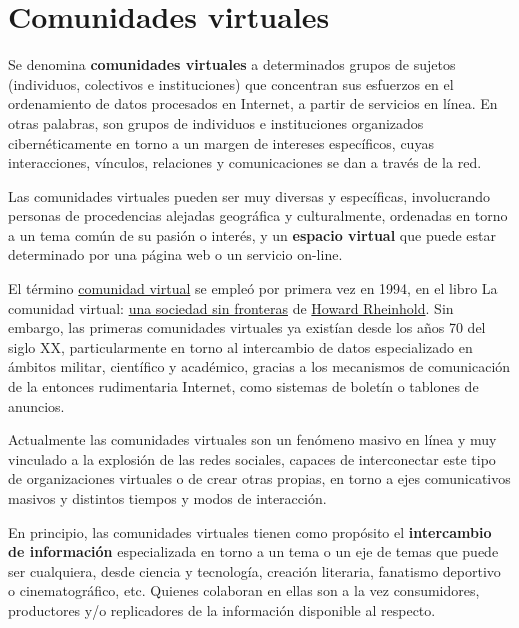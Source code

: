 \chapter{Comunidades virtuales}
\label{comunidades-virtuales}

Se denomina \textbf{comunidades virtuales} a determinados grupos de sujetos (individuos, colectivos e instituciones) que concentran sus esfuerzos en el ordenamiento de datos procesados en Internet, a partir de servicios en línea. En otras palabras, son grupos de individuos e instituciones organizados cibernéticamente en torno a un margen de intereses específicos, cuyas interacciones, vínculos, relaciones y comunicaciones se dan a través de la red.

Las comunidades virtuales pueden ser muy diversas y específicas, involucrando personas de procedencias alejadas geográfica y culturalmente, ordenadas en torno a un tema común de su pasión o interés, y un \textbf{espacio virtual} que puede estar determinado por una página web o un servicio on-line.

El término \href{https://es.wikipedia.org/wiki/Comunidad_virtual}{comunidad virtual} se empleó por primera vez en 1994, en el libro La comunidad virtual: \href{https://www.casadellibro.com/libro-la-comunidad-virtual-una-sociedad-sin-fronteras/9788474325621/542034}{una sociedad sin fronteras} de \href{https://es.wikipedia.org/wiki/Howard_Rheingold}{Howard Rheinhold}. Sin embargo, las primeras comunidades virtuales ya existían desde los años 70 del siglo XX, particularmente en torno al intercambio de datos especializado en ámbitos militar, científico y académico, gracias a los mecanismos de comunicación de la entonces rudimentaria Internet, como sistemas de boletín o tablones de anuncios.

Actualmente las comunidades virtuales son un fenómeno masivo en línea y muy vinculado a la explosión de las redes sociales, capaces de interconectar este tipo de organizaciones virtuales o de crear otras propias, en torno a ejes comunicativos masivos y distintos tiempos y modos de interacción.

En principio, las comunidades virtuales tienen como propósito el \textbf{intercambio de información} especializada en torno a un tema o un eje de temas que puede ser cualquiera, desde ciencia y tecnología, creación literaria, fanatismo deportivo o cinematográfico, etc. Quienes colaboran en ellas son a la vez consumidores, productores y/o replicadores de la información disponible al respecto.

